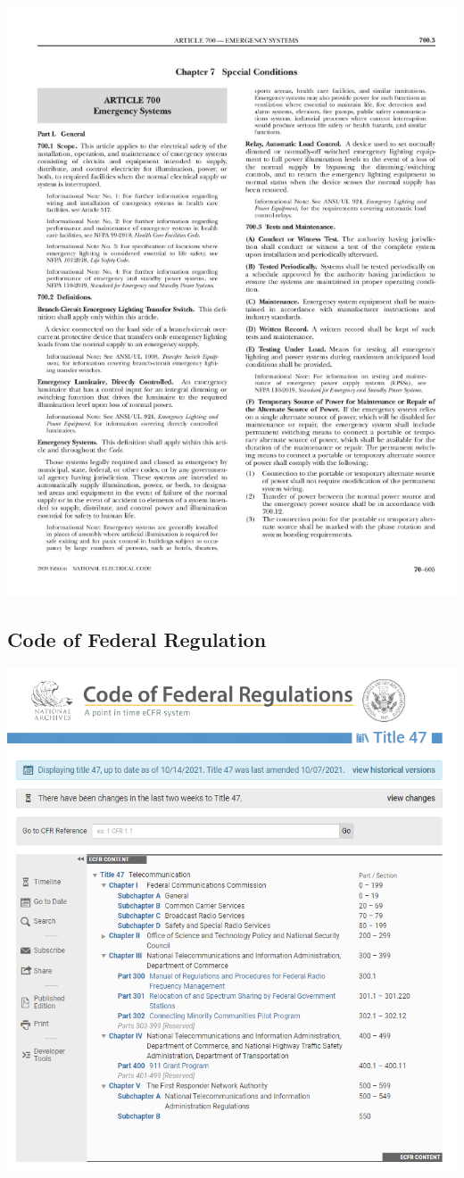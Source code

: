 \newpage
\begin{center}
	\includegraphics[scale=1]{./images/nec2020_7}
\end{center}
\newpage

\subsection{Code of Federal Regulation}
\begin{center}
	\includegraphics[scale=1]{./images/code_of_federal_regulation}
\end{center}
